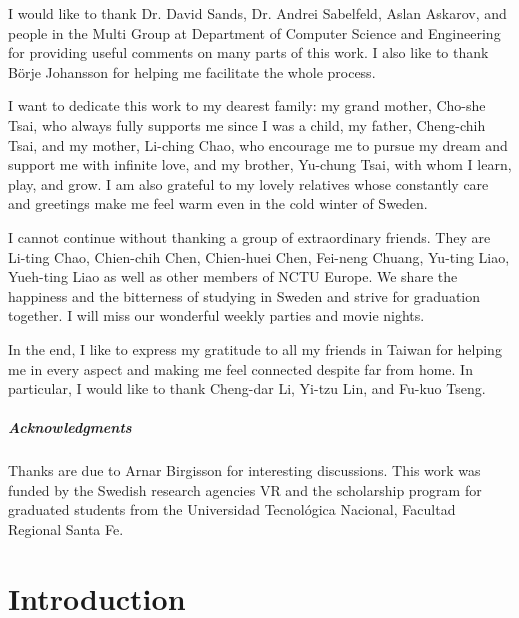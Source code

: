 \documentclass[a4paper]{report}
\begin{document}
I would like to thank Dr. David Sands, Dr. Andrei Sabelfeld, Aslan Askarov, and people in the Multi
Group at Department of Computer Science and Engineering for providing useful comments on many 
parts of this work. I also like to thank B\"{o}rje Johansson for helping me facilitate the 
whole process.

I want to dedicate this work to my dearest family: my grand mother, Cho-she Tsai, who always fully supports
me since I was a child, my father, Cheng-chih Tsai, and my mother, Li-ching Chao, who encourage me
to pursue my dream and support me with infinite love, and my brother, Yu-chung Tsai, with whom I learn, play, 
and grow. I am also grateful to my lovely relatives whose constantly care and greetings make me
feel warm even in the cold winter of Sweden.

I cannot continue without thanking a group of extraordinary friends. They are Li-ting Chao, 
Chien-chih Chen, Chien-huei Chen, Fei-neng Chuang, Yu-ting Liao, Yueh-ting Liao as well as
other members of NCTU Europe. We share the happiness and the bitterness of studying in Sweden and
strive for graduation together. I will miss our wonderful weekly parties and movie nights.

In the end, I like to express my gratitude to all my friends in Taiwan for helping me
in every aspect and making me feel connected despite far from home.
In particular, I would like to thank Cheng-dar Li, Yi-tzu Lin, and Fu-kuo Tseng.


{\small{
\paragraph{Acknowledgments}
Thanks are due to Arnar Birgisson for interesting discussions.
This work was funded by the Swedish research agencies VR and 
the scholarship program for graduated students 
from the Universidad Tecnol\'{o}gica Nacional, Facultad Regional Santa Fe. 
}}

\cleardoublepage
\pagestyle{plain}


\chapter{Introduction}
\label{Chap:Introduction}

\end{document}
